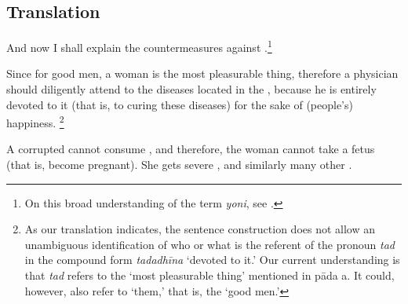     \subsection{Translation}
    \begin{translation}
        
        \item [1] And now I shall explain the countermeasures against
.\footnote{On this broad understanding of the term
    \emph{yoni}, see \cite[pp.\ 572--5]{das-2003}.}
            
            
            \item [*3] Since for good men, a woman is the most pleasurable thing, 
            therefore a physician should diligently attend to the diseases located in the 
            , because he is entirely devoted to it 
            (that is, to curing these diseases) for the sake of (people's) happiness.%
            \footnote{%
                As our translation indicates, the sentence construction does not allow an 
                unambiguous identification of who or what is the referent of the pronoun 
                \emph{tad} in the compound form \emph{tadadhīna} ‘devoted to it.’ Our 
                current understanding is that \emph{tad} refers to the ‘most pleasurable 
                thing’ 
                mentioned in pāda a. It could, however, also refer to ‘them,’ that is, the ‘good 
                men.’%
                }
                
                \item [*4] A corrupted  cannot 
                consume 
                , and therefore, the woman cannot take a fetus (that is, 
                become pregnant). She gets severe 
                , 
                 and similarly many other 
                .
         

\end{translation}
